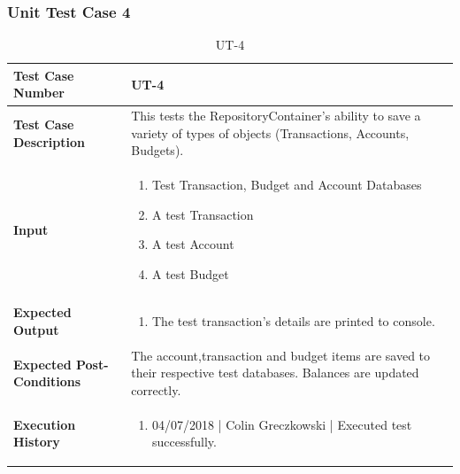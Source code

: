 \documentclass[12pt]{article}
\begin{document}
\subsubsection{Unit Test Case 4}
\def\arraystretch{1.5}%
\begin{table}[htbp]
\centering
\caption {UT-4}
\label{UT-4}
\begin{tabularx}{\textwidth}{ | l | X |}
\hline
\textbf{Test Case Number}      &  UT-4                         \\ \hline
\textbf{Test Case Description}    &  This tests the RepositoryContainer's ability to save a variety of types of objects (Transactions, Accounts, Budgets).                \\ \hline
\textbf{Input}         & 	\begin{enumerate}
          \item Test Transaction, Budget and Account Databases
	\item A test Transaction
	\item A test Account
	\item A test Budget
\end{enumerate} \\ \hline

\textbf{Expected Output}     & \begin{enumerate}
	\item The test transaction's details are printed to console.
\end{enumerate} \\ \hline
\textbf{Expected Post-Conditions}           & The account,transaction and budget items are saved to their respective test databases. Balances are updated correctly.                \\ \hline
\textbf{Execution History}   &  \begin{enumerate}
	\item 04/07/2018 | Colin Greczkowski | Executed test successfully.
\end {enumerate} \\ \hline
\end{tabularx}
\end{table}
\clearpage

\end{document}
